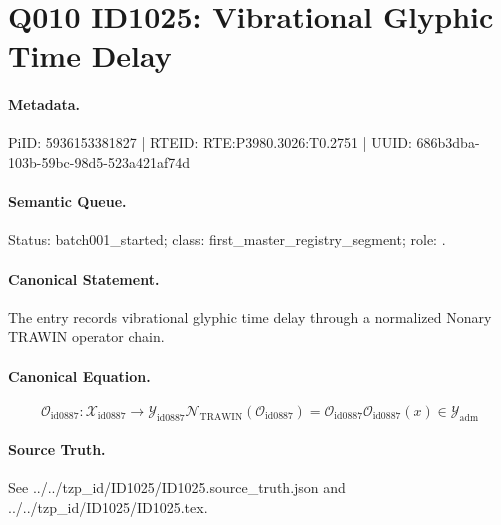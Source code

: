 \section*{Q010 ID1025: Vibrational Glyphic Time Delay}
\paragraph{Metadata.}
PiID: 5936153381827 | RTEID: RTE:P3980.3026:T0.2751 | UUID: 686b3dba-103b-59bc-98d5-523a421af74d

\paragraph{Semantic Queue.}
Status: batch001\_started; class: first\_master\_registry\_segment; role: .

\paragraph{Canonical Statement.}
The entry records vibrational glyphic time delay through a normalized Nonary TRAWIN operator chain.

\paragraph{Canonical Equation.}
\[
\mathcal{O}_{\mathrm{id0887}}:\mathcal{X}_{\mathrm{id0887}}\longrightarrow\mathcal{Y}_{\mathrm{id0887}} \mathcal{N}_{\mathrm{TRAWIN}}(\mathcal{O}_{\mathrm{id0887}})=\mathcal{O}_{\mathrm{id0887}} \mathcal{O}_{\mathrm{id0887}}(x)\in\mathcal{Y}_{\mathrm{adm}}
\]

\paragraph{Source Truth.}
See ../../tzp\_id/ID1025/ID1025.source\_truth.json and ../../tzp\_id/ID1025/ID1025.tex.
